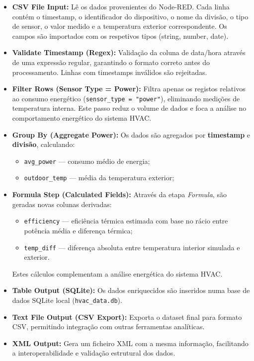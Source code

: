 \documentclass[a4paper, 12pt]{article} %
\begin{document}
\begin{itemize}
	\item \textbf{CSV File Input:}  
	Lê os dados provenientes do Node-RED. Cada linha contém o timestamp, o identificador do dispositivo, o nome da divisão, o tipo de sensor, o valor medido e a temperatura exterior correspondente.  
	Os campos são importados com os respetivos tipos (string, number, date).
	
	\item \textbf{Validate Timestamp (Regex):}  
	Validação da coluna de data/hora através de uma expressão regular, garantindo o formato correto antes do processamento. Linhas com timestamps inválidos são rejeitadas.
	
	\item \textbf{Filter Rows (Sensor Type = Power):}  
	Filtra apenas os registos relativos ao consumo energético (\texttt{sensor\_type = "power"}), eliminando medições de temperatura interna.  
	Este passo reduz o volume de dados e foca a análise no comportamento energético do sistema HVAC.
	
	\item \textbf{Group By (Aggregate Power):}  
	Os dados são agregados por \textbf{timestamp} e \textbf{divisão}, calculando:
	\begin{itemize}
		\item \texttt{avg\_power} — consumo médio de energia;
		\item \texttt{outdoor\_temp} — média da temperatura exterior;
	\end{itemize}
	
	\item \textbf{Formula Step (Calculated Fields):}  
	Através da etapa \textit{Formula}, são geradas novas colunas derivadas:
	\begin{itemize}
		\item \texttt{efficiency} — eficiência térmica estimada com base no rácio entre potência média e diferença térmica;
		\item \texttt{temp\_diff} — diferença absoluta entre temperatura interior simulada e exterior.
	\end{itemize}
	Estes cálculos complementam a análise energética do sistema HVAC.
	
	\item \textbf{Table Output (SQLite):}  
	Os dados enriquecidos são inseridos numa base de dados SQLite local (\texttt{hvac\_data.db}).
	
	\item \textbf{Text File Output (CSV Export):}  
	Exporta o dataset final para formato CSV, permitindo integração com outras ferramentas analíticas.
	
	\item \textbf{XML Output:}  
	Gera um ficheiro XML com a mesma informação, facilitando a interoperabilidade e validação estrutural dos dados.
\end{itemize}
\end{document}
